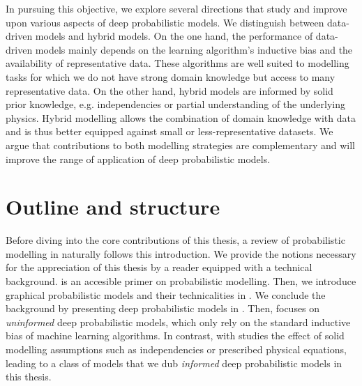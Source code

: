 In pursuing this objective, we explore several directions that study and improve upon various aspects of deep probabilistic models. We distinguish between data-driven models and hybrid models. On the one hand, the performance of data-driven models mainly depends on the learning algorithm's inductive bias and the availability of representative data. These algorithms are well suited to modelling tasks for which we do not have strong domain knowledge but access to many representative data. On the other hand, hybrid models are informed by solid prior knowledge, e.g. independencies or partial understanding of the underlying physics. Hybrid modelling allows the combination of domain knowledge with data and is thus better equipped against small or less-representative datasets. We argue that contributions to both modelling strategies are complementary and will improve the range of application of deep probabilistic models.





\section{Outline and structure}

Before diving into the core contributions of this thesis, a review of probabilistic modelling in  naturally follows this introduction. We provide the notions necessary for the appreciation of this thesis by a reader equipped with a technical background.   is an accesible primer on probabilistic modelling. Then, we introduce graphical probabilistic models and their technicalities in . We conclude the background by presenting deep probabilistic models in  . Then,  focuses on \textit{uninformed} deep probabilistic models, which only rely on the standard inductive bias of machine learning algorithms. In contrast, with  studies the effect of solid modelling assumptions such as independencies or prescribed physical equations, leading to a class of models that we dub \textit{informed} deep probabilistic models in this thesis.

